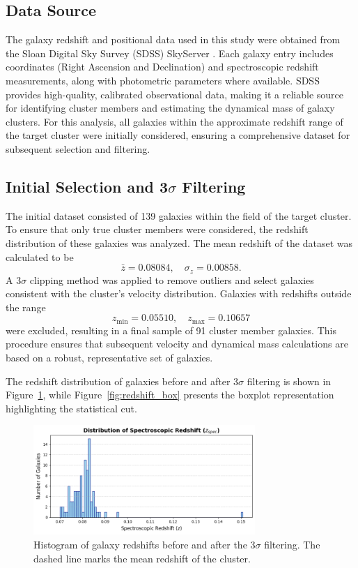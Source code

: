 \documentclass[12pt]{article}
\begin{document}
\subsection{Data Source}
The galaxy redshift and positional data used in this study were obtained from the Sloan Digital Sky Survey (SDSS) SkyServer \cite{sdss}. 
Each galaxy entry includes coordinates (Right Ascension and Declination) and spectroscopic redshift measurements, along with photometric 
parameters where available. SDSS provides high-quality, calibrated observational data, making it a reliable source for identifying cluster members 
and estimating the dynamical mass of galaxy clusters. For this analysis, all galaxies within the approximate redshift range of the target cluster 
were initially considered, ensuring a comprehensive dataset for subsequent selection and filtering.

\subsection{Initial Selection and 3$\sigma$ Filtering}
The initial dataset consisted of 139 galaxies within the field of the target cluster. To ensure that only true cluster members were considered, 
the redshift distribution of these galaxies was analyzed. The mean redshift of the dataset was calculated to be
\[
    \bar{z} = 0.08084, \quad \sigma_z = 0.00858.
\]
A $3\sigma$ clipping method was applied to remove outliers and select galaxies consistent with the cluster’s velocity distribution. 
Galaxies with redshifts outside the range
\[
    z_{\min} = 0.05510, \quad z_{\max} = 0.10657
\]
were excluded, resulting in a final sample of 91 cluster member galaxies. This procedure ensures that subsequent velocity and dynamical 
mass calculations are based on a robust, representative set of galaxies.

The redshift distribution of galaxies before and after $3\sigma$ filtering is shown in Figure~\ref{fig:redshift_hist}, while 
Figure~\ref{fig:redshift_box} presents the boxplot representation highlighting the statistical cut.

\begin{figure}[H]
    \centering
    \includegraphics[width=0.75\textwidth]{redshift_hist.png}
    \caption{Histogram of galaxy redshifts before and after the $3\sigma$ filtering. 
    The dashed line marks the mean redshift of the cluster.}
    \label{fig:redshift_hist}
\end{figure}
\end{document}

